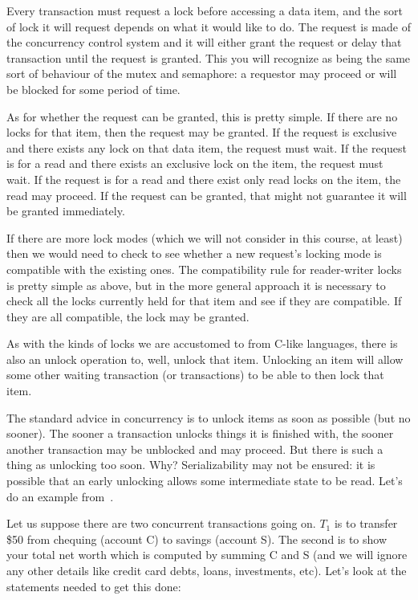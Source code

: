 Every transaction must request a lock before accessing a data item, and the sort of lock it will request depends on what it would like to do. The request is made of the concurrency control system and it will either grant the request or delay that transaction until the request is granted. This you will recognize as being the same sort of behaviour of the mutex and semaphore: a requestor may proceed or will be blocked for some period of time.

As for whether the request can be granted, this is pretty simple. If there are no locks for that item, then the request may be granted. If the request is exclusive and there exists any lock on that data item, the request must wait. If the request is for a read and there exists an exclusive lock on the item, the request must wait. If the request is for a read and there exist only read locks on the item, the read may proceed. If the request can be granted, that might not guarantee it will be granted immediately.

If there are more lock modes (which we will not consider in this course, at least) then we would need to check to see whether a new request's locking mode is compatible with the existing ones. The compatibility rule for reader-writer locks is pretty simple as above, but in the more general approach it is necessary to check all the locks currently held for that item and see if they are compatible. If they are all compatible, the lock may be granted.

As with the kinds of locks we are accustomed to from C-like languages, there is also an unlock operation to, well, unlock that item. Unlocking an item will allow some other waiting transaction (or transactions) to be able to then lock that item.

The standard advice in concurrency is to unlock items as soon as possible (but no sooner). The sooner a transaction unlocks things it is finished with, the sooner another transaction may be unblocked and may proceed. But there is such a thing as unlocking too soon. Why? Serializability may not be ensured: it is possible that an early unlocking allows some intermediate state to be read. Let's do an example from~\cite{dsc}.

Let us suppose there are two concurrent transactions going on. $T_{1}$ is to transfer \$50 from chequing (account C) to savings (account S). The second is to show your total net worth which is computed by summing C and S (and we will ignore any other details like credit card debts, loans, investments, etc). Let's look at the statements needed to get this done:

